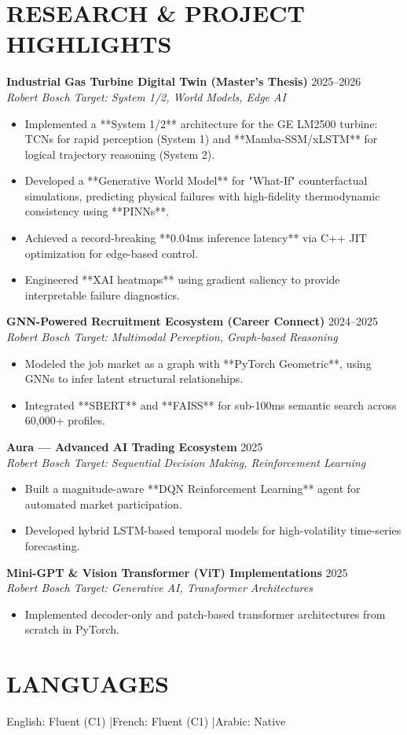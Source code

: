 \documentclass[a4paper,11pt]{article}
\begin{document}
\section{RESEARCH \& PROJECT HIGHLIGHTS}

\textbf{Industrial Gas Turbine Digital Twin (Master's Thesis)} \hfill 2025--2026 \\
\textit{Robert Bosch Target: System 1/2, World Models, Edge AI}
\begin{itemize}
    \item Implemented a **System 1/2** architecture for the GE LM2500 turbine: TCNs for rapid perception (System 1) and **Mamba-SSM/xLSTM** for logical trajectory reasoning (System 2).
    \item Developed a **Generative World Model** for "What-If" counterfactual simulations, predicting physical failures with high-fidelity thermodynamic consistency using **PINNs**.
    \item Achieved a record-breaking **0.04ms inference latency** via C++ JIT optimization for edge-based control.
    \item Engineered **XAI heatmaps** using gradient saliency to provide interpretable failure diagnostics.
\end{itemize}

\textbf{GNN-Powered Recruitment Ecosystem (Career Connect)} \hfill 2024--2025 \\
\textit{Robert Bosch Target: Multimodal Perception, Graph-based Reasoning}
\begin{itemize}
    \item Modeled the job market as a graph with **PyTorch Geometric**, using GNNs to infer latent structural relationships.
    \item Integrated **SBERT** and **FAISS** for sub-100ms semantic search across 60,000+ profiles.
\end{itemize}

\textbf{Aura — Advanced AI Trading Ecosystem} \hfill 2025 \\
\textit{Robert Bosch Target: Sequential Decision Making, Reinforcement Learning}
\begin{itemize}
    \item Built a magnitude-aware **DQN Reinforcement Learning** agent for automated market participation.
    \item Developed hybrid LSTM-based temporal models for high-volatility time-series forecasting.
\end{itemize}

\textbf{Mini-GPT \& Vision Transformer (ViT) Implementations} \hfill 2025 \\
\textit{Robert Bosch Target: Generative AI, Transformer Architectures}
\begin{itemize}
    \item Implemented decoder-only and patch-based transformer architectures from scratch in PyTorch.
\end{itemize}

\section{LANGUAGES}
English: Fluent (C1) \quad|\quad French: Fluent (C1) \quad|\quad Arabic: Native
\end{document}
